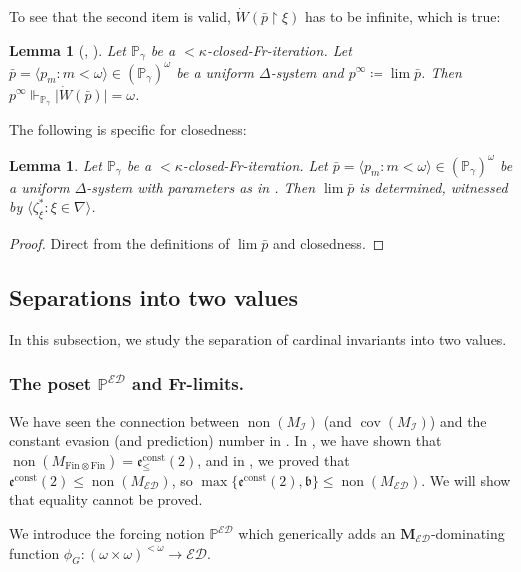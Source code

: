 \documentclass[a4paper,12pt]{amsart}
\newtheorem{lem}[thm]{Lemma}
\theoremstyle{definition}
\numberwithin{thm}{section}
\numberwithin{equation}{section}
\newcommand{\p}{\mathbb{P}}
\newcommand{\on}{\mathpunct{\upharpoonright}}
\newcommand{\bb}{\mathfrak{b}}
\newcommand{\ee}{\mathfrak{e}}
\DeclareMathOperator{\non}{non}
\DeclareMathOperator{\cov}{cov}
\newcommand{\ed}{\mathcal{ED}}
\newcommand{\I}{\mathscr{I}}
\newcommand{\finfin}{\mathrm{Fin}\otimes\mathrm{Fin}}
\newcommand{\posetED}{\mathbb{P}^{\ed}}
\newcommand{\eec}{\ee^{\mathrm{const}}}
\newcommand{\eect}{\ee^{\mathrm{const}}(2)}
\begin{document}
    To see that the second item is valid, $\dot{W}(\bar{p}\on\xi)$ has to be infinite, which is true: 
    
    \begin{lem}[{\cite{Mej19}, \cite[Lemma 3.6]{CGHY24}}]\label{lem:Fr-limit_principle}
        Let $\p_\gamma$ be a ${<}\kappa$-closed-Fr-iteration. Let $\bar{p}=\langle p_m: m<\omega\rangle\in(\p_\gamma)^\omega$ be a uniform $\Delta$-system and $p^\infty\coloneq\lim\bar{p}$.
    	Then
    	$p^\infty\Vdash_{\p_\gamma}\lvert\dot{W}(\bar{p})\rvert=\omega$.
    \end{lem}
    
    The following is specific for closedness:
    
    \begin{lem}\label{lem:closedness}
        Let $\p_\gamma$ be a ${<}\kappa$-closed-Fr-iteration. Let $\bar{p}=\langle p_m: m<\omega\rangle\in(\p_\gamma)^\omega$ be a uniform $\Delta$-system with parameters as in . Then $\lim\bar{p}$ is determined, witnessed by $\langle\zeta^{*}_{\xi} :\xi\in\nabla\rangle$.
    \end{lem}
    \begin{proof}
        Direct from the definitions of $\lim\bar{p}$ and closedness.
    \end{proof}
    

    \subsection{Separations into two values}\label{sec:Fr-limits}

    In this subsection, we study the separation of cardinal invariants into two values.


    \subsubsection{The poset $\posetED$ and Fr-limits.}
    
    We have seen the connection between $\non(M_{\I})$ (and $\cov(M_{\I})$) and the constant evasion (and prediction) number in . In , we have shown that $\non(M_{\finfin})=\eec_{\leq}(2)$, and in , we proved that $\eect\leq\non(M_{\ed})$, so $\max\{\eect,\bb\}\leq\non(M_{\ed})$. We will show that equality cannot be proved. 
    
    We introduce the forcing notion $\posetED$ which generically adds an $\mathbf{M}_{\ed}$-dominating function $\phi_G\colon(\omega\times\omega)^{<\omega}\to\ed$.
    
\end{document}
